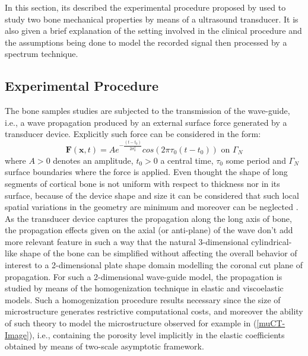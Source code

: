 In this section, its described the experimental procedure proposed by \cite{Minonzio2018} used to study two bone mechanical properties by means of a ultrasound transducer.
It is also given a brief explanation of the setting involved in the clinical procedure and the assumptions being done to model the recorded signal then processed by a spectrum technique. 

\subsection{Experimental Procedure}
The bone samples studies are subjected to the transmission of the wave-guide, i.e., a wave propagation produced by an external surface force generated by a transducer device. 
Explicitly such force can be considered in the form:
\begin{equation*}
    \mathbf{F}(\mathbf{x},t) = A e^{-\frac{(t-t_0)}{2\sigma_0^2}} cos(2 \pi \tau_0 (t-t_0)) \text{ on } \Gamma_N
\end{equation*}
where $A > 0$ denotes an amplitude, $t_0 > 0$ a central time, $\tau_0$ some period and $\Gamma_N$ surface boundaries where the force is applied.
Even thought the shape of long segments of cortical bone is not uniform with respect to thickness nor in its surface, because of the device shape and size it can be considered that such local spatial variations in the geometry are minimum and moreover can be neglected \cite{Foiret2014}.
As the transducer device captures the propagation along the long axis of bone, the propagation effects given on the axial (or anti-plane) of the wave don't add more relevant feature in such a way that the natural 3-dimensional cylindrical-like shape of the bone can be simplified without affecting the overall behavior of interest to a 2-dimensional plate shape domain modelling the coronal cut plane of propagation.
For such a 2-dimensional wave-guide model, the propagation is studied by means of the homogenization technique in elastic and viscoelastic models. Such a homogenization procedure results necessary since the size of microstructure generates restrictive computational costs, and moreover the ability of such theory to model the microstructure observed for example in (\ref{muCT-Image}), i.e., containing the porosity level implicitly in the elastic coefficients obtained by means of two-scale asymptotic framework.



